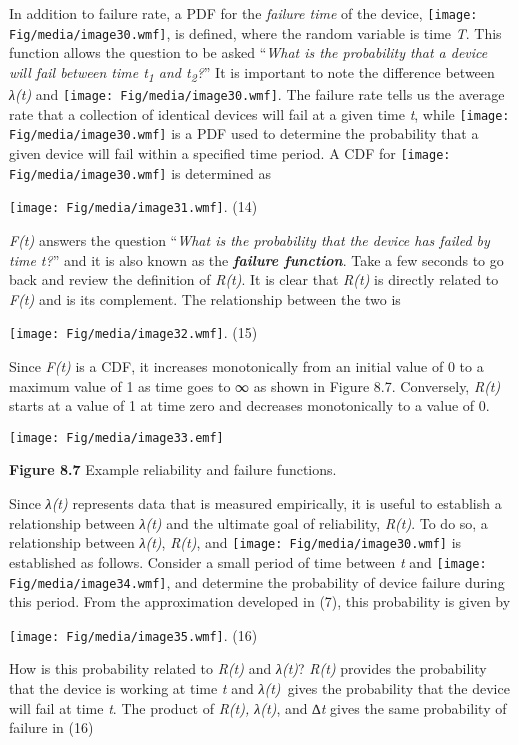 In addition to failure rate, a PDF for the \emph{failure time} of the
device, \texttt{[image: Fig/media/image30.wmf]}, is defined, where the
random variable is time \emph{T}. This function allows the question to
be asked ``\emph{What is the probability that a device will fail between
time t\textsubscript{1} and t\textsubscript{2}?}'' It is important to
note the difference between \emph{λ(t)} and
\texttt{[image: Fig/media/image30.wmf]}. The failure rate tells us the
average rate that a collection of identical devices will fail at a given
time \emph{t}, while \texttt{[image: Fig/media/image30.wmf]} is a PDF
used to determine the probability that a given device will fail within a
specified time period. A CDF for \texttt{[image: Fig/media/image30.wmf]}
is determined as

\texttt{[image: Fig/media/image31.wmf]}. (14)

\emph{F(t)} answers the question ``\emph{What is the probability that
the device has failed by time t?}'' and it is also known as the
\emph{\textbf{failure function}}. Take a few seconds to go back and
review the definition of \emph{R(t)}. It is clear that \emph{R(t)} is
directly related to \emph{F(t)} and is its complement. The relationship
between the two is

\texttt{[image: Fig/media/image32.wmf]}. (15)

Since \emph{F(t)} is a CDF, it increases monotonically from an initial
value of 0 to a maximum value of 1 as time goes to ∞ as shown in Figure
8.7. Conversely, \emph{R(t)} starts at a value of 1 at time zero and
decreases monotonically to a value of 0.

\texttt{[image: Fig/media/image33.emf]}

\textbf{Figure 8.7} Example reliability and failure functions.

Since \emph{λ(t)} represents data that is measured empirically, it is
useful to establish a relationship between \emph{λ(t)} and the ultimate
goal of reliability, \emph{R(t)}. To do so, a relationship between
\emph{λ(t)}, \emph{R(t)}, and \texttt{[image: Fig/media/image30.wmf]} is
established as follows. Consider a small period of time between \emph{t}
and \texttt{[image: Fig/media/image34.wmf]}, and determine the
probability of device failure during this period. From the approximation
developed in (7), this probability is given by

\texttt{[image: Fig/media/image35.wmf]}. (16)

How is this probability related to \emph{R(t)} and \emph{λ(t)}?
\emph{R(t)} provides the probability that the device is working at time
\emph{t} and \emph{λ(t)~}gives the probability that the device will fail
at time \emph{t}. The product of \emph{R(t), λ(t)}, and ∆\emph{t} gives
the same probability of failure in (16)

